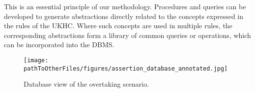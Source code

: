 This is an essential principle of our methodology. Procedures and queries can be developed to generate abstractions directly related to the concepts expressed in the rules of the UKHC. 
Where such concepts are used in multiple rules, the corresponding abstractions form a library of common queries or operations, which can be incorporated into the DBMS. %
%
%
%        
%

\begin{figure}
    \centering
    \texttt{[image: \\pathToOtherFiles/figures/assertion\_database\_annotated.jpg]}
    \caption{Database view of the overtaking scenario.}
    \label{fig:assertion_database_annotated}
\end{figure}

